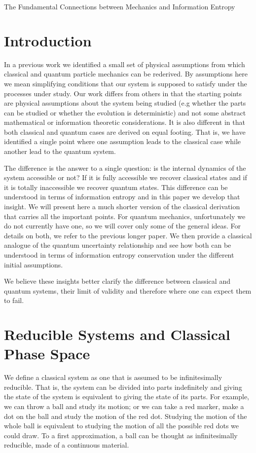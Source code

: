 \documentclass{ws-ijqi}
\begin{document}
{The Fundamental Connections between Mechanics and Information Entropy}

\section{Introduction}
In a previous work we identified a small set of physical assumptions from which classical and quantum particle mechanics can be rederived. By assumptions here we mean simplifying conditions that our system is supposed to satisfy under the processes under study. Our work differs from others in that the starting points are physical assumptions about the system being studied (e.g whether the parts can be studied or whether the evolution is deterministic) and not some abstract mathematical or information theoretic considerations. It is also different in that both classical and quantum cases are derived on equal footing. That is, we have identified a single point where one assumption leads to the classical case while another lead to the quantum system.

The difference is the answer to a single question: is the internal dynamics of the system accessible or not? If it is fully accessible we recover classical states and if it is totally inaccessible we recover quantum states. This difference can be understood in terms of information entropy and in this paper we develop that insight. We will present here a much shorter version of the classical derivation that carries all the important points. For quantum mechanics, unfortunately we do not currently have one, so we will cover only some of the general ideas. For details on both, we refer to the previous longer paper. We then provide a classical analogue of the quantum uncertainty relationship and see how both can be understood in terms of information entropy conservation under the different initial assumptions.

We believe these insights better clarify the difference between classical and quantum systems, their limit of validity and therefore where one can expect them to fail.

\section{Reducible Systems and Classical Phase Space}
We define a classical system as one that is assumed to be infinitesimally reducible. That is, the system can be divided into parts indefinitely and giving the state of the system is equivalent to giving the state of its parts. For example, we can throw a ball and study its motion; or we can take a red marker, make a dot on the ball and study the motion of the red dot. Studying the motion of the whole ball is equivalent to studying the motion of all the possible red dots we could draw. To a first approximation, a ball can be thought as infinitesimally reducible, made of a continuous material.
\end{document}
